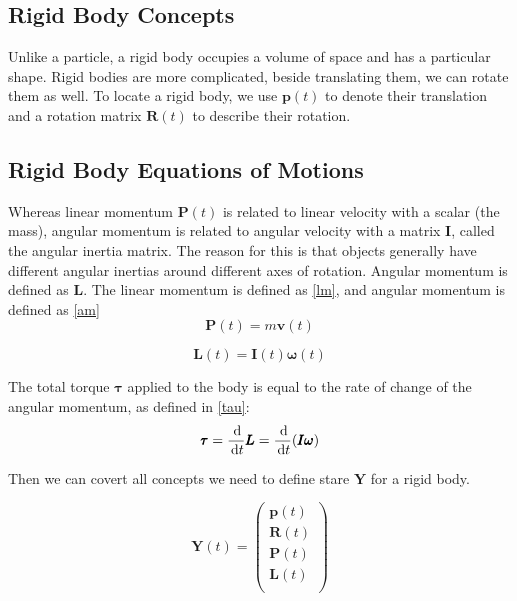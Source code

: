 \subsection{Rigid Body Concepts}
Unlike a particle, a rigid body occupies a volume of space and has a particular shape. Rigid bodies are more complicated, beside translating them, we can rotate them as well. To locate a rigid body, we use $\pmb{p}(t)$ to denote their translation and a rotation matrix $\pmb{R}(t)$ to describe their rotation.

\subsection{Rigid Body Equations of Motions}
 Whereas linear momentum $\pmb{P}(t)$ is related to linear velocity with a scalar (the mass), angular momentum is related to angular velocity with a matrix \(\pmb{I}\), called the angular inertia matrix. The reason for this is that objects generally have different angular inertias around different axes of rotation. Angular momentum is defined as \(\pmb{L}\). The linear momentum is defined as \ref{lm}, and angular momentum is defined as \ref{am}
\begin{equation}
    \pmb{P}(t) = m \pmb{v} (t)
    \label{lm}
\end{equation}

\begin{equation}
    \pmb{L}(t) = \pmb{I}(t)\pmb{\omega}(t)
    \label{am}
\end{equation}

The total torque $\pmb{\tau}$ applied to the body is equal to the rate of change of the angular momentum, as defined in \ref{tau}:
\begin{equation}
    \pmb{\tau} = \frac{\,\mathrm{d}}{\,\mathrm{d} t }\pmb{L} = \frac{\,\mathrm{d}}{\,\mathrm{d} t }(\pmb{I}\pmb{\omega})
    \label{tau}
\end{equation}

 Then we can covert all concepts we need to define stare $\textbf{Y}$ for a rigid body.

\begin{equation}
    \textbf{Y}(t) = \left(
        \begin{array}{c}
            \pmb{p}(t) \\
            \pmb{R}(t) \\
            \pmb{P}(t) \\
            \pmb{L}(t) \\
        \end{array}
    \right)
\end{equation}

